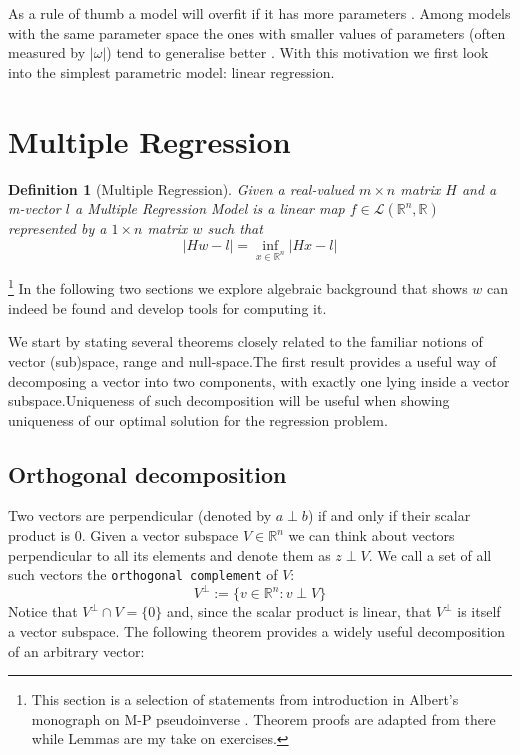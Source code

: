 \documentclass[a4paper,11pt]{article}
\theoremstyle{break}
\newtheorem{definition}{Definition}[section]
\newcommand{\R}{\mathbb{R}}
\begin{document}
As a rule of thumb a model will overfit if it has more parameters \cite[pp112-113]{goodfellow}. Among models with the same parameter space the ones with smaller values of parameters (often measured by $ | \omega | $) tend to generalise better \cite[p119]{goodfellow}.
With this motivation we first look into the simplest parametric model: linear regression.

\section{Multiple Regression}

\begin{definition}[Multiple Regression]
    Given a real-valued $ m \times n$ matrix $H$ and a m-vector $l$ a Multiple Regression Model is a linear map $f \in \mathcal{L} ( \R ^n, \R)$ represented by a $ 1 \times n$ matrix $w$ such that
    \begin{equation}\label{def2}
        | H w - l | = \inf\limits_{x \in \R^n} | H x - l |
    \end{equation}
\end{definition}

\footnote{This section is a selection of statements from introduction in Albert's monograph on M-P pseudoinverse \cite[pp6-12]{albert}. Theorem proofs are adapted from there while Lemmas are my take on exercises.}
%
In the following two sections we explore algebraic background that shows $ w $ can indeed be found and develop tools for computing it.


%
We start by stating several theorems closely related to the familiar notions of vector (sub)space, range and null-space.The first result provides a useful way of decomposing a vector into two components, with exactly one lying inside a vector subspace.Uniqueness of such decomposition will be useful when showing uniqueness of our optimal solution for the regression problem.

\subsection{Orthogonal decomposition}
Two vectors are perpendicular (denoted by $ a \perp b$) if and only if their scalar product is 0. Given a vector subspace $V \in \R^n$ we can think about vectors perpendicular to all its elements and denote them as $z \perp V$. We call a set of all such vectors the \texttt{orthogonal complement} of $V$:
$$ V^\perp := \{ v \in \R^n : v \perp V\} $$
Notice that $V^\perp \cap V = \{0\}$ and, since the scalar product is linear, that $V^\perp$ is itself a vector subspace. The following theorem provides a widely useful decomposition of an arbitrary vector:
\end{document}
